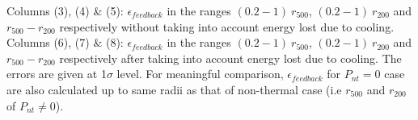 \documentclass[a4paper,fleqn,usenatbib]{mnras}
\begin{document}
\begin{table*}
\begin{tabular}{@{}lccccccc}
\end{tabular}

 Columns (3), (4) \& (5): $\epsilon_{feedback}$ in the ranges $(0.2-1)~r_{500}$, $(0.2-1)~r_{200}$ and $r_{500}-r_{200}$ respectively without taking into account energy lost due to cooling. 
 Columns (6), (7) \& (8): $\epsilon_{feedback}$ in the ranges $(0.2-1)~r_{500}$, $(0.2-1)~r_{200}$ and $r_{500}-r_{200}$ respectively after taking into account energy lost due to cooling. The errors are given at 1$\sigma$ level.
For meaningful comparison, $\epsilon_{feedback}$ for $P_{nt}=0$ case are also calculated up to same radii as that of non-thermal case (i.e $r_{500}$ and $r_{200}$ of $P_{nt}\neq0$).
\end{table*}
\end{document}
